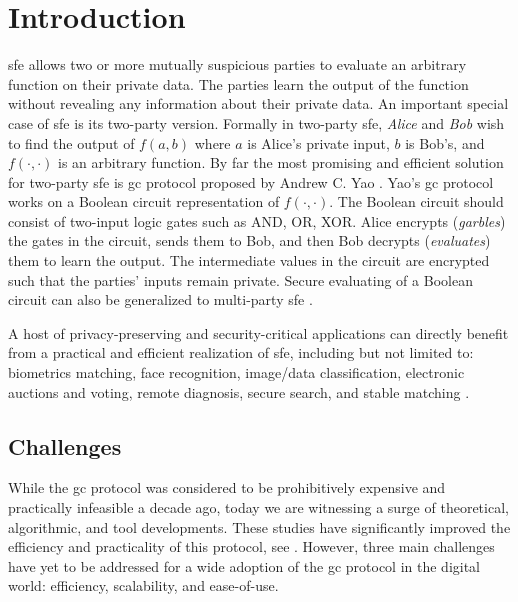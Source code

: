 \chapter{Introduction}
\acrfull{sfe} allows two or more mutually suspicious parties to evaluate an arbitrary function on their private data.
The parties learn the output of the function without revealing any information about their private data.
An important special case of \acrshort{sfe} is its two-party version.
Formally in two-party \acrshort{sfe}, \textit{Alice} and \textit{Bob} wish to find the output of $f(a, b)$ where $a$ is Alice's private input, $b$ is Bob's, and $f(\cdot,\cdot)$ is an arbitrary function.
By far the most promising and efficient solution for two-party \acrshort{sfe} is \acrfull{gc} protocol proposed by Andrew C. Yao \cite{yao1986generate}.
Yao's \acrshort{gc} protocol works on a Boolean circuit representation of $f(\cdot,\cdot)$.
The Boolean circuit should consist of two-input logic gates such as AND, OR, XOR.
Alice encrypts (\textit{garbles}) the gates in the circuit, sends them to Bob, and then Bob decrypts (\textit{evaluates}) them to learn the output.
The intermediate values in the circuit are encrypted such that the parties' inputs remain private.
Secure evaluating of a Boolean circuit can also be generalized to multi-party \acrshort{sfe} \cite{goldreich1987play, ben2008fairplaymp}.

A host of privacy-preserving and security-critical applications can directly benefit from a practical and efficient realization of \acrshort{sfe}, including but not limited to: biometrics matching, face recognition, image/data classification, electronic auctions and voting, remote diagnosis, secure search, and stable matching \cite{riazi2017toward, zhang2016robust, bringer2013privacy, evans2011efficient, barni2009secure, naor1999privacy, brickell2007privacy, jha2008towards}.

\section{Challenges}
While the \acrshort{gc} protocol was considered to be prohibitively expensive and practically infeasible a decade ago, today we are witnessing a surge of theoretical, algorithmic, and tool developments.
These studies have significantly improved the efficiency and practicality of this protocol, see \cite{malkhi2004fairplay, kolesnikov2008improved, pinkas2009secure, huang2011faster, bellare2013efficient, zahur2015two, zahur2015obliv, liu2015oblivm}.
However, three main challenges have yet to be addressed for a wide adoption of the \acrshort{gc} protocol in the digital world: efficiency, scalability, and ease-of-use.

